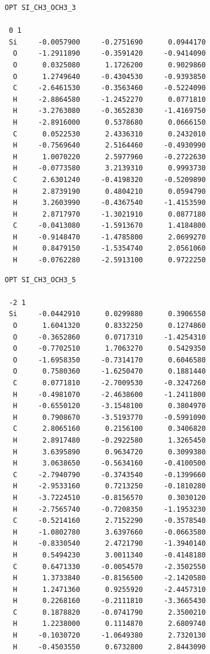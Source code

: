 \documentclass[
  digital, %
  table,   %
  lof,     %
  lot,     %
  oneside,
]{fithesis3}
\begin{document}
 \begin{lstlisting}[frame=single, caption={\ce{Si(CH3)(OCH3)3} },label=DescriptiveLabel]
 OPT SI_CH3_OCH3_3

 0 1
 Si     -0.0057900     -0.2751690      0.0944170
  O     -1.2911890     -0.3591420     -0.9414090
  O      0.0325080      1.1726200      0.9029860
  O      1.2749640     -0.4304530     -0.9393850
  C     -2.6461530     -0.3563460     -0.5224090
  H     -2.8864580     -1.2452270      0.0771810
  H     -3.2763080     -0.3652830     -1.4169750
  H     -2.8916000      0.5378680      0.0666150
  C      0.0522530      2.4336310      0.2432010
  H     -0.7569640      2.5164460     -0.4930990
  H      1.0070220      2.5977960     -0.2722630
  H     -0.0773580      3.2139310      0.9993730
  C      2.6301240     -0.4198320     -0.5209890
  H      2.8739190      0.4804210      0.0594790
  H      3.2603990     -0.4367540     -1.4153590
  H      2.8717970     -1.3021910      0.0877180
  C     -0.0413080     -1.5913670      1.4184800
  H     -0.9148470     -1.4785800      2.0699270
  H      0.8479150     -1.5354740      2.0561060
  H     -0.0762280     -2.5913100      0.9722250

 \end{lstlisting}

 \begin{lstlisting}[frame=single, caption={\ce{Si(CH3)(OCH3)5} },label=DescriptiveLabel]
 OPT SI_CH3_OCH3_5

 -2 1
 Si     -0.0442910      0.0299880      0.3906550
  O      1.6041320      0.8332250      0.1274860
  O     -0.3652860      0.0717310     -1.4254310
  O     -0.7702510      1.7063270      0.5429350
  O     -1.6958350     -0.7314170      0.6046580
  O      0.7580360     -1.6250470      0.1881440
  C      0.0771810     -2.7009530     -0.3247260
  H     -0.4981070     -2.4638600     -1.2411800
  H     -0.6550120     -3.1548100      0.3804970
  H      0.7908670     -3.5193770     -0.5991090
  C      2.8065160      0.2156100      0.3406820
  H      2.8917480     -0.2922580      1.3265450
  H      3.6395890      0.9634720      0.3099380
  H      3.0638650     -0.5634160     -0.4100500
  C     -2.7940790     -0.3743540     -0.1399660
  H     -2.9533160      0.7213250     -0.1810280
  H     -3.7224510     -0.8156570      0.3030120
  H     -2.7565740     -0.7208350     -1.1953230
  C     -0.5214160      2.7152290     -0.3578540
  H     -1.0802780      3.6397660     -0.0663580
  H     -0.8330540      2.4721790     -1.3940140
  H      0.5494230      3.0011340     -0.4148180
  C      0.6471330     -0.0054570     -2.3502550
  H      1.3733840     -0.8156500     -2.1420580
  H      1.2471360      0.9255920     -2.4457310
  H      0.2268160     -0.2111810     -3.3665430
  C      0.1878820     -0.0741790      2.3500210
  H      1.2238000      0.1114870      2.6809740
  H     -0.1030720     -1.0649380      2.7320130
  H     -0.4503550      0.6732800      2.8443090

 \end{lstlisting}
\end{document}
